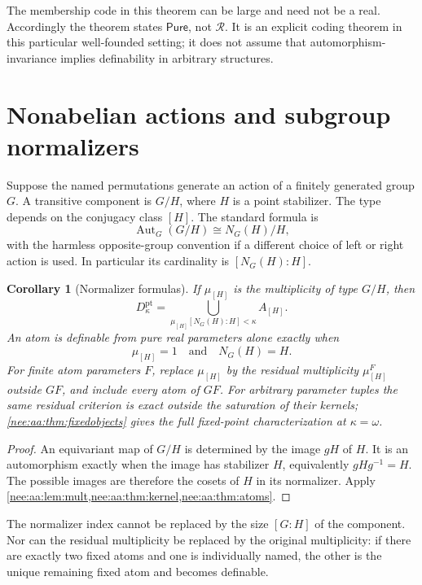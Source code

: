 \documentclass[11pt,letterpaper]{article}
\numberwithin{equation}{section}
\theoremstyle{plain}
\newtheorem{corollary}[corollary]{Corollary}
\theoremstyle{definition}
\theoremstyle{remark}
\newcommand{\Aut}{\operatorname{Aut}}
\newcommand{\Pure}{\mathsf{Pure}}
\newcommand{\srcs}[1]{\par\noindent{\footnotesize\textit{Sources:} #1}\par}
\begin{document}
The membership code in this theorem can be large and need not be a real.
Accordingly the theorem states $\Pure$, not $\mathscr R$. It is an explicit
coding theorem in this particular well-founded setting; it does not assume
that automorphism-invariance implies definability in arbitrary structures.

\section{Nonabelian actions and subgroup normalizers}\label{nee:aa:sec:groups}

Suppose the named permutations generate an action of a finitely generated
group $G$. A transitive component is $G/H$, where $H$ is a point stabilizer.
The type depends on the conjugacy class $[H]$. The standard formula
\cite[Theorem 8]{Boardman} is
\[
\Aut_G(G/H)\cong N_G(H)/H,
\]
with the harmless opposite-group convention if a different choice of left or
right action is used. In particular its cardinality is $[N_G(H):H]$.

\begin{corollary}[Normalizer formulas]\label{nee:aa:cor:normalizer}
If $\mu_{[H]}$ is the multiplicity of type $G/H$, then
\[
D^{\mathrm{pt}}_\kappa
=\bigcup_{\mu_{[H]}[N_G(H):H]<\kappa} A_{[H]}.
\]
An atom is definable from pure real parameters alone exactly when
\[
\mu_{[H]}=1\quad\text{and}\quad N_G(H)=H.
\]
For finite atom parameters $F$, replace $\mu_{[H]}$ by the residual multiplicity
$\mu_{[H]}^F$ outside $GF$, and include every atom of $GF$.
For arbitrary parameter tuples the same residual criterion is exact outside
the saturation of their kernels; \cref{nee:aa:thm:fixedobjects} gives the full
fixed-point characterization at $\kappa=\omega$.
\end{corollary}
\srcs{source~03, Corollary~5.1.}
\begin{proof}
An equivariant map of $G/H$ is determined by the image $gH$ of $H$. It is an
automorphism exactly when the image has stabilizer $H$, equivalently
$gHg^{-1}=H$. The possible images are therefore the cosets of $H$ in its
normalizer. Apply \cref{nee:aa:lem:mult,nee:aa:thm:kernel,nee:aa:thm:atoms}.
\end{proof}

The normalizer index cannot be replaced by the size $[G:H]$ of the component.
Nor can the residual multiplicity be replaced by the original multiplicity:
if there are exactly two fixed atoms and one is individually named, the other
is the unique remaining fixed atom and becomes definable.
\end{document}
